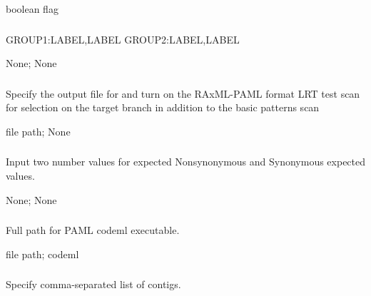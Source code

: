 \documentclass[letterpaper,11pt,english]{sphinxmanual}
\begin{document}
 boolean flag


\subsubsection{}
\label{\detokenize{prog_desc:allele-groups-allelegroups}}
 GROUP1:LABEL,LABEL GROUP2:LABEL,LABEL

 None;  None


\subsubsection{}
\label{\detokenize{prog_desc:branchlrt-branch-lrt}}
 Specify the output file for and turn on the RAxML-PAML format LRT test scan for selection on the target branch in addition to the basic patterns scan

 file path;  None


\subsubsection{}
\label{\detokenize{prog_desc:chi-test-chitest}}
 Input two number values for expected Nonsynonymous and Synonymous expected values.

 None;  None


\subsubsection{}
\label{\detokenize{prog_desc:codemlpath-codeml-path}}
 Full path for PAML codeml executable.

 file path;  codeml


\subsubsection{}
\label{\detokenize{prog_desc:id94}}
 Specify comma-separated list of contigs.
\end{document}
